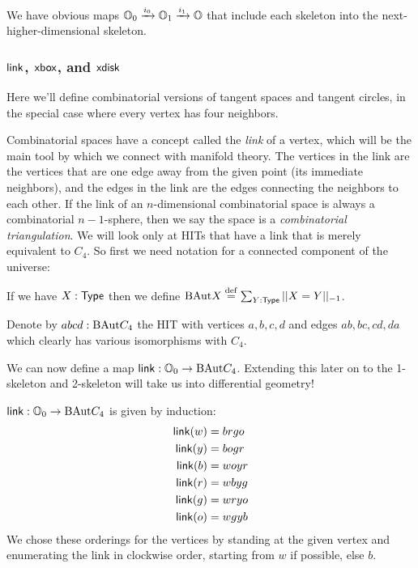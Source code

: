 We have obvious maps \( \mathbb{O}_0\xrightarrow[]{i_0} \mathbb{O}_1\xrightarrow[]{i_1} \mathbb{O} \) that include each skeleton into the next-higher-dimensional skeleton.

\subsubsection{\texorpdfstring{\( \mathsf{link} \), \( \mathsf{xbox} \), and \( \mathsf{xdisk} \)}{link, xbox, and xdisk}}

Here we'll define combinatorial versions of tangent spaces and tangent circles, in the special case where every vertex has four neighbors.

Combinatorial spaces have a concept called the \emph{link} of a vertex, which will be the main tool by which we connect with manifold theory. The vertices in the link are the vertices that are one edge away from the given point (its immediate neighbors), and the edges in the link are the edges connecting the neighbors to each other. If the link of an \( n \)-dimensional combinatorial space is always a combinatorial \( n-1 \)-sphere, then we say the space is a \emph{combinatorial triangulation}. We will look only at HITs that have a link that is merely equivalent to \( C_4 \). So first we need notation for a connected component of the universe:

\begin{mydef}
If we have \( X:\mathsf{Type} \) then we define \( \mathrm{BAut} X\stackrel{\mathrm{def}}{=} \sum_{Y:\mathsf{Type}} ||X=Y||_{-1} \). 
\end{mydef}

Denote by \( abcd:\mathrm{BAut} C_4 \) the HIT with vertices \( a, b, c, d \) and edges \( ab, bc, cd, da \) which clearly has various isomorphisms with \( C_4 \).

We can now define a map \( \mathsf{link}:\mathbb{O}_0\to\mathrm{BAut} C_4 \). Extending this later on to the 1-skeleton and 2-skeleton will take us into differential geometry!

\begin{mydef}
\( \mathsf{link}:\mathbb{O}_0\to\mathrm{BAut} C_4 \) is given by induction:
\begin{align*}
\mathsf{link}(w) &= brgo \\
\mathsf{link}(y) &= bogr \\
\mathsf{link}(b) &= woyr \\
\mathsf{link}(r) &= wbyg \\
\mathsf{link}(g) &= wryo \\
\mathsf{link}(o) &= wgyb
\end{align*}
We chose these orderings for the vertices by standing at the given vertex and enumerating the link in clockwise order, starting from \( w \) if possible, else \( b \).
\end{mydef}

